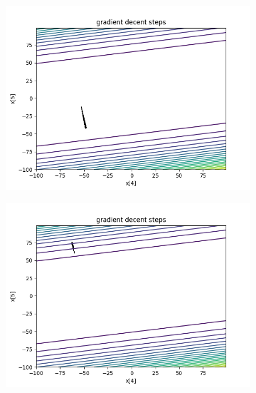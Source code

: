 	\begin{figure}[h!]
		\centering
		\begin{subfigure}[b]{0.45\linewidth}
			\includegraphics[width=\linewidth]{photos/f3_1_2.png}
		\end{subfigure}
		\begin{subfigure}[b]{0.45\linewidth}
			\includegraphics[width=\linewidth]{photos/f3_2_2.png}
		\end{subfigure}
		\begin{subfigure}[b]{0.45\linewidth}

\end{subfigure}
\end{figure}
